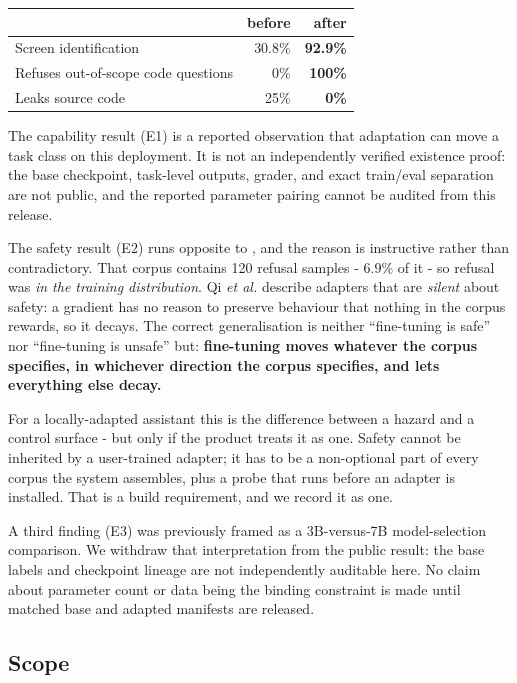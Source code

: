 \documentclass[conference]{IEEEtran}
\begin{document}
\begin{center}\small
\begin{tabular}{lrr}
\toprule
& \textbf{before} & \textbf{after} \\
\midrule
Screen identification & 30.8\% & \textbf{92.9\%} \\
Refuses out-of-scope code questions & 0\% & \textbf{100\%} \\
Leaks source code & 25\% & \textbf{0\%} \\
\bottomrule
\end{tabular}
\end{center}

The capability result (E1) is a reported observation that adaptation can move a
task class on this deployment. It is not an independently verified existence
proof: the base checkpoint, task-level outputs, grader, and exact train/eval
separation are not public, and the reported parameter pairing cannot be audited
from this release.

The safety result (E2) runs opposite to \cite{qi2023finetuning}, and the reason
is instructive rather than contradictory. That corpus contains 120 refusal
samples - $6.9\%$ of it - so refusal was \emph{in the training distribution}.
Qi \emph{et al.} describe adapters that are \emph{silent} about safety: a
gradient has no reason to preserve behaviour that nothing in the corpus rewards,
so it decays. The correct generalisation is neither ``fine-tuning is safe'' nor
``fine-tuning is unsafe'' but: \textbf{fine-tuning moves whatever the corpus
specifies, in whichever direction the corpus specifies, and lets everything else
decay.}

For a locally-adapted assistant this is the difference between a hazard and a
control surface - but only if the product treats it as one. Safety cannot be
inherited by a user-trained adapter; it has to be a non-optional part of every
corpus the system assembles, plus a probe that runs before an adapter is
installed. That is a build requirement, and we record it as one.

A third finding (E3) was previously framed as a 3B-versus-7B model-selection
comparison. We withdraw that interpretation from the public result: the base
labels and checkpoint lineage are not independently auditable here. No claim
about parameter count or data being the binding constraint is made until matched
base and adapted manifests are released.

\subsection{Scope}
\end{document}
